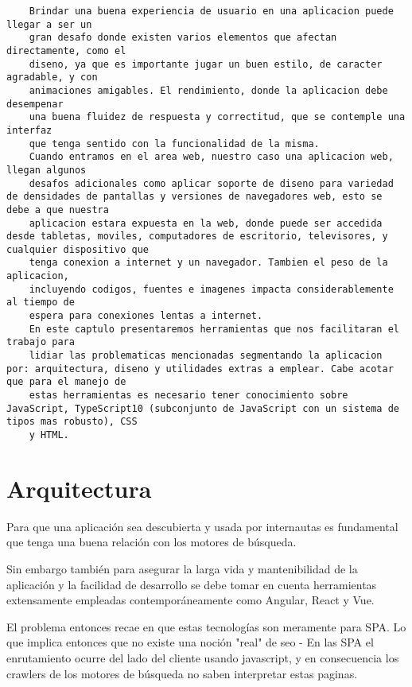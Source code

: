 \begin{lstlisting}
    Brindar una buena experiencia de usuario en una aplicacion puede llegar a ser un
    gran desafo donde existen varios elementos que afectan directamente, como el
    diseno, ya que es importante jugar un buen estilo, de caracter agradable, y con
    animaciones amigables. El rendimiento, donde la aplicacion debe desempenar
    una buena fluidez de respuesta y correctitud, que se contemple una interfaz
    que tenga sentido con la funcionalidad de la misma.
    Cuando entramos en el area web, nuestro caso una aplicacion web, llegan algunos
    desafos adicionales como aplicar soporte de diseno para variedad de densidades de pantallas y versiones de navegadores web, esto se debe a que nuestra
    aplicacion estara expuesta en la web, donde puede ser accedida desde tabletas, moviles, computadores de escritorio, televisores, y cualquier dispositivo que
    tenga conexion a internet y un navegador. Tambien el peso de la aplicacion,
    incluyendo codigos, fuentes e imagenes impacta considerablemente al tiempo de
    espera para conexiones lentas a internet.
    En este captulo presentaremos herramientas que nos facilitaran el trabajo para
    lidiar las problematicas mencionadas segmentando la aplicacion por: arquitectura, diseno y utilidades extras a emplear. Cabe acotar que para el manejo de
    estas herramientas es necesario tener conocimiento sobre JavaScript, TypeScript10 (subconjunto de JavaScript con un sistema de tipos mas robusto), CSS
    y HTML.
\end{lstlisting}

\section{Arquitectura}

Para que una aplicación sea descubierta y usada por internautas es fundamental que tenga una buena relación con los motores de búsqueda.

Sin embargo también para asegurar la larga vida y mantenibilidad de la aplicación y la facilidad de desarrollo se debe tomar en cuenta herramientas extensamente empleadas contemporáneamente como Angular, React y Vue.

El problema entonces recae en que estas tecnologías son meramente para SPA. Lo que implica entonces que no existe una noción "real" de seo - En las SPA el enrutamiento ocurre del lado del cliente usando javascript, y en consecuencia los crawlers de los motores de búsqueda no saben interpretar estas paginas.

